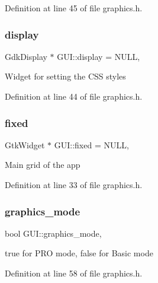 Definition at line 45 of file graphics.\+h.

\mbox{\label{class_g_u_i_a3c9c6eda274513cd9316a2d8bdc127b0}} 
\subsubsection{\texorpdfstring{display}{display}}
{\footnotesize\ttfamily Gdk\+Display $\ast$ G\+U\+I\+::display = N\+U\+LL\hspace{0.3cm}{\ttfamily [static]}, {\ttfamily [protected]}}

Widget for setting the C\+SS styles 

Definition at line 44 of file graphics.\+h.

\mbox{\label{class_g_u_i_a71dba7d167bef1305da908de9f0eba80}} 
\subsubsection{\texorpdfstring{fixed}{fixed}}
{\footnotesize\ttfamily Gtk\+Widget $\ast$ G\+U\+I\+::fixed = N\+U\+LL\hspace{0.3cm}{\ttfamily [static]}, {\ttfamily [protected]}}

Main grid of the app 

Definition at line 33 of file graphics.\+h.

\mbox{\label{class_g_u_i_abb868a957e22d3debbf9c707aadfdd44}} 
\subsubsection{\texorpdfstring{graphics\_mode}{graphics\_mode}}
{\footnotesize\ttfamily bool G\+U\+I\+::graphics\+\_\+mode\hspace{0.3cm}{\ttfamily [static]}, {\ttfamily [protected]}}

true for P\+RO mode, false for Basic mode 

Definition at line 58 of file graphics.\+h.

\mbox{\label{class_g_u_i_a4fe5d81a72449afa0cbd2228cddd48c0}} 

